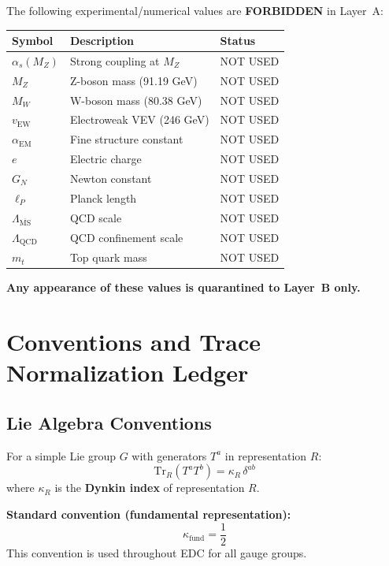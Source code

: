 \documentclass[11pt,a4paper]{article}
\theoremstyle{definition}
\begin{document}
\begin{forbiddenbox}
The following experimental/numerical values are \textbf{FORBIDDEN} in Layer~A:
\begin{center}
\begin{tabular}{lll}
\toprule
\textbf{Symbol} & \textbf{Description} & \textbf{Status} \\
\midrule
$\alpha_s(M_Z)$ & Strong coupling at $M_Z$ & NOT USED \\
$M_Z$ & Z-boson mass (91.19 GeV) & NOT USED \\
$M_W$ & W-boson mass (80.38 GeV) & NOT USED \\
$v_{\text{EW}}$ & Electroweak VEV (246 GeV) & NOT USED \\
$\alpha_{\text{EM}}$ & Fine structure constant & NOT USED \\
$e$ & Electric charge & NOT USED \\
$G_N$ & Newton constant & NOT USED \\
$\ell_P$ & Planck length & NOT USED \\
$\Lambda_{\overline{\text{MS}}}$ & QCD scale & NOT USED \\
$\Lambda_{\text{QCD}}$ & QCD confinement scale & NOT USED \\
$m_t$ & Top quark mass & NOT USED \\
\bottomrule
\end{tabular}
\end{center}
\textbf{Any appearance of these values is quarantined to Layer~B only.}
\end{forbiddenbox}

\newpage

\section{Conventions and Trace Normalization Ledger}
\label{sec:conventions}

\subsection{Lie Algebra Conventions}
\label{subsec:lie-conventions}

\begin{canonbox}
For a simple Lie group $G$ with generators $T^a$ in representation $R$:
\begin{equation}
  \label{eq:trace-convention}
  \text{Tr}_R(T^a T^b) = \kappa_R \, \delta^{ab}
\end{equation}
where $\kappa_R$ is the \textbf{Dynkin index} of representation $R$.

\textbf{Standard convention (fundamental representation):}
\begin{equation}
  \label{eq:fundamental-trace}
  \kappa_{\text{fund}} = \frac{1}{2}
\end{equation}
This convention is used throughout EDC for all gauge groups.
\end{canonbox}
\end{document}
